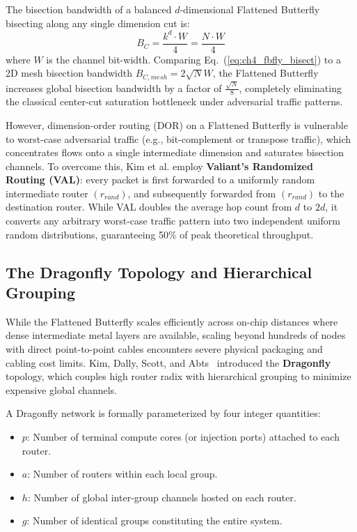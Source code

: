 The bisection bandwidth of a balanced $d$-dimensional Flattened Butterfly bisecting along any single dimension cut is:
\begin{equation}
B_C = \frac{k^d \cdot W}{4} = \frac{N \cdot W}{4}
\label{eq:ch4_fbfly_bisect}
\end{equation}
where $W$ is the channel bit-width. Comparing Eq.~(\ref{eq:ch4_fbfly_bisect}) to a 2D mesh bisection bandwidth $B_{C, mesh} = 2 \sqrt{N} W$, the Flattened Butterfly increases global bisection bandwidth by a factor of $\frac{\sqrt{N}}{8}$, completely eliminating the classical center-cut saturation bottleneck under adversarial traffic patterns.

However, dimension-order routing (DOR) on a Flattened Butterfly is vulnerable to worst-case adversarial traffic (e.g., bit-complement or transpose traffic), which concentrates flows onto a single intermediate dimension and saturates bisection channels. To overcome this, Kim et al. employ \textbf{Valiant's Randomized Routing (VAL)}: every packet is first forwarded to a uniformly random intermediate router $(r_{rand})$, and subsequently forwarded from $(r_{rand})$ to the destination router. While VAL doubles the average hop count from $d$ to $2d$, it converts any arbitrary worst-case traffic pattern into two independent uniform random distributions, guaranteeing 50\% of peak theoretical throughput.

\subsection{The Dragonfly Topology and Hierarchical Grouping}
\label{subsec:ch4_dragonfly}
While the Flattened Butterfly scales efficiently across on-chip distances where dense intermediate metal layers are available, scaling beyond hundreds of nodes with direct point-to-point cables encounters severe physical packaging and cabling cost limits. Kim, Dally, Scott, and Abts~\cite{Kim2008} introduced the \textbf{Dragonfly} topology, which couples high router radix with hierarchical grouping to minimize expensive global channels.

A Dragonfly network is formally parameterized by four integer quantities:
\begin{itemize}
    \item $p$: Number of terminal compute cores (or injection ports) attached to each router.
    \item $a$: Number of routers within each local group.
    \item $h$: Number of global inter-group channels hosted on each router.
    \item $g$: Number of identical groups constituting the entire system.
\end{itemize}

